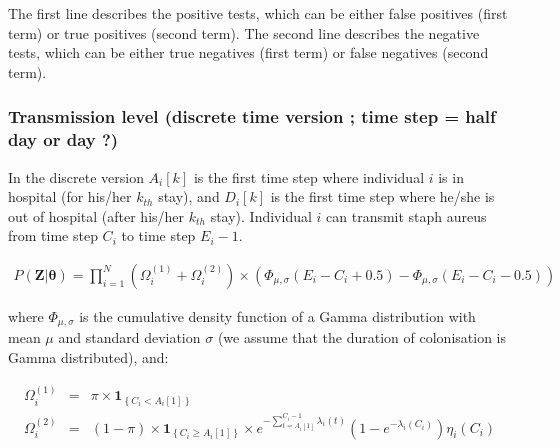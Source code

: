 \documentclass[10pt]{article}
\begin{document}
The first line describes the positive tests, which can be either false positives (first term) or true positives (second term). 
The second line describes the negative tests, which can be either true negatives (first term) or false negatives (second term). 


\subsubsection*{Transmission level (discrete time version ; time step = half day or day ?)} 


In the discrete version $A_i[k]$ is the first time step where individual $i$ is in hospital (for his/her $k_{th}$ stay), and $D_i[k]$ is the first time step where he/she is out of hospital (after his/her $k_{th}$ stay). Individual $i$ can transmit staph aureus from time step $C_i$ to time step $E_i-1$. 

\begin{eqnarray*}
P\left(\bm{Z}|\bm{\theta}\right) = 
\bm{\prod}_{i=1}^N %
\left( \Omega_i^{\left(1\right)} + \Omega_i^{\left(2\right)} \right) \times \left(\Phi_{\mu,\sigma}\left(E_i-C_i+0.5\right) - \Phi_{\mu,\sigma}\left(E_i-C_i-0.5\right) \right)
\end{eqnarray*}

\noindent where $\Phi_{\mu,\sigma}$ is the cumulative density function of a Gamma distribution with mean $\mu$ and standard deviation $\sigma$ (we assume that the duration of colonisation is Gamma distributed), and: 

\begin{eqnarray*}
\Omega_i^{\left(1\right)} & = & \pi \times \mathbf{1}_{\left\lbrace C_i < A_i[1] \right\rbrace}  \\
\Omega_i^{\left(2\right)}  & = & \left( 1-\pi \right) \times \mathbf{1}_{\left\lbrace C_i \geq A_i[1] \right\rbrace} \times e^{-\sum_{t=A_i[1]}^{C_i-1}\lambda_i\left(t\right)} \left( 1 - e^{-\lambda_i\left(C_i\right)} \right) \eta_i\left(C_i\right)\\
\end{eqnarray*}
\bigskip
\end{document}
